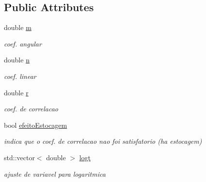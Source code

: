 \subsection*{Public Attributes}
\begin{DoxyCompactItemize}
\item 
\hypertarget{classCAjusteCurva_ad475e0f4f3c7b77bf10a00e4adb46282}{double \hyperlink{classCAjusteCurva_ad475e0f4f3c7b77bf10a00e4adb46282}{m}}\label{classCAjusteCurva_ad475e0f4f3c7b77bf10a00e4adb46282}

\begin{DoxyCompactList}\small\item\em coef. angular \end{DoxyCompactList}\item 
\hypertarget{classCAjusteCurva_a5c75119dc972a7c7cfd067a9b74c3642}{double \hyperlink{classCAjusteCurva_a5c75119dc972a7c7cfd067a9b74c3642}{n}}\label{classCAjusteCurva_a5c75119dc972a7c7cfd067a9b74c3642}

\begin{DoxyCompactList}\small\item\em coef. linear \end{DoxyCompactList}\item 
\hypertarget{classCAjusteCurva_a21ca23b4c39833776028822f3de6758b}{double \hyperlink{classCAjusteCurva_a21ca23b4c39833776028822f3de6758b}{r}}\label{classCAjusteCurva_a21ca23b4c39833776028822f3de6758b}

\begin{DoxyCompactList}\small\item\em coef. de correlacao \end{DoxyCompactList}\item 
\hypertarget{classCAjusteCurva_a193c50c4214e29b8ed43d6023d42e47a}{bool \hyperlink{classCAjusteCurva_a193c50c4214e29b8ed43d6023d42e47a}{efeito\-Estocagem}}\label{classCAjusteCurva_a193c50c4214e29b8ed43d6023d42e47a}

\begin{DoxyCompactList}\small\item\em indica que o coef. de correlacao nao foi satisfatorio (ha estocagem) \end{DoxyCompactList}\item 
\hypertarget{classCAjusteCurva_a98acb361b2bfb83752d043d0cd0e7e6e}{std\-::vector$<$ double $>$ \hyperlink{classCAjusteCurva_a98acb361b2bfb83752d043d0cd0e7e6e}{logt}}\label{classCAjusteCurva_a98acb361b2bfb83752d043d0cd0e7e6e}

\begin{DoxyCompactList}\small\item\em ajuste de variavel para logaritmica \end{DoxyCompactList}\end{DoxyCompactItemize}
